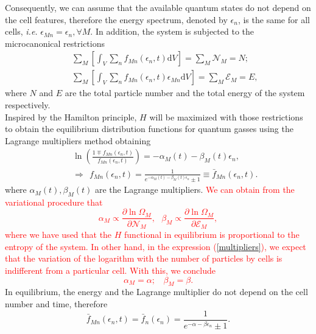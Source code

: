 \documentclass{article}
\begin{document}
Consequently, we can assume that the available quantum states do not depend on the cell features,
therefore the energy spectrum, denoted by $\epsilon_n$, is the same for all cells, \textit{i.e.} $\epsilon_{Mn} = \epsilon_n, \forall M$. In addition, the system is subjected to the microcanonical restrictions
\begin{eqnarray}
    &&\sum_{M} \left[\int_V \sum_{n}f_{Mn}(\epsilon_{n} ,t)\mathrm{d}V\right]=\sum_{M} {\mathcal{N}}_{M}=N; \nonumber \\
    &&\sum_{M}\left[\int_V \sum_{n}f_{Mn}(\epsilon_{n},t)\epsilon_{Mn}\mathrm{d}V\right]=\sum_M {\mathcal{E}}_M=E, \label{restriccions1}
\end{eqnarray}
where $N$ and $E$ are the total particle number and the total energy of the system respectively.\\ 
Inspired by the Hamilton principle, $H$ will be maximized with those restrictions to obtain the equilibrium distribution functions for quantum gasses using the Lagrange multipliers method obtaining
\begin{eqnarray}
&&\ln \left(\frac{1\mp f_{Mn}(\epsilon_{n},t)}{f_{Mn}(\epsilon_{n},t)} \right)=-\alpha_M(t)-\beta_M(t) \epsilon_{n}, \label{relation}\\ &&\Rightarrow \ \ f_{Mn}(\epsilon_{n},t)=\frac{1}{e^{-\alpha_M(t)-\beta_M(t) \epsilon_{n}}\pm 1} \equiv \bar{f}_{Mn}(\epsilon_{n},t) \label{distributionequilibrium}.
\end{eqnarray}
where $\alpha_M(t), \beta_M(t)$ are the Lagrange multipliers. \textcolor{red}{We can obtain from the variational procedure that 
\begin{equation}
    \alpha_M\propto \frac{\partial \ln \Omega_M}{\partial \mathcal{N}_M}, \ \ \ \beta_M\propto \frac{\partial \ln \Omega_M}{\partial \mathcal{E}_M},\label{multipliers}
\end{equation}
where we have used that the $H$ functional in equilibrium is proportional to the entropy of the system.
In other hand, in the expression (\ref{multipliers}), we expect that the variation of the logarithm with the number of particles by cells is indifferent from a particular cell. With this, we conclude  
\begin{equation}
    \alpha_M=\alpha; \ \ \ \ \beta_M=\beta.
\end{equation}}
In equilibrium, the energy and the Lagrange multiplier do not depend on the cell number and time, therefore
\begin{equation}
    \bar f_{Mn}(\epsilon_{n},t)=\bar f_n(\epsilon_{n}) =\frac{1}{e^{-\alpha-\beta \epsilon_n}\pm 1}.
\end{equation}{}
\end{document}
